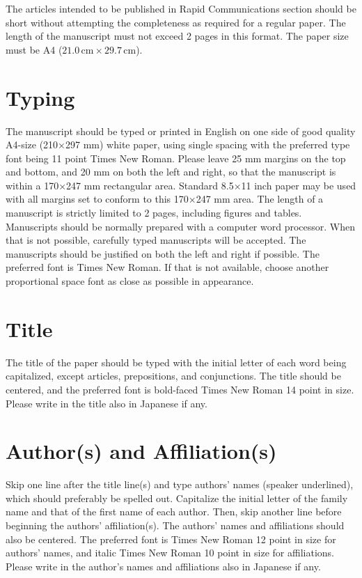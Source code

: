 \documentclass[a4paper,twocolumn,fleqn]{article}
\begin{document}
The articles intended to be published in Rapid Communications section
should be short without attempting the completeness as required for a
regular paper.  The length of the manuscript must not exceed 2
pages in this format.  The paper size must be A4 ($21.0\,\mathrm{cm}
\times 29.7\,\mathrm{cm}$).

\section{Typing}
The manuscript should be typed or printed in English
on one side of good quality A4-size (210×297 mm) white paper,
using single spacing with the preferred type font
being 11 point Times New Roman.
%
Please leave 25 mm margins on the top and bottom,
and 20 mm on both the left and right,
so that the manuscript is within a 170×247 mm rectangular area.
%
Standard 8.5×11 inch paper may be used with all margins set to conform to
this 170×247 mm area.
%
The length of a manuscript is strictly limited to 2 pages,
including figures and tables.
%
Manuscripts should be normally prepared with a computer word processor.
%
When that is not possible, carefully typed manuscripts will be accepted.
%
The manuscripts should be justified on both the left and right if possible.
The preferred font is Times New Roman.
If that is not available, choose another proportional space font
as close as possible in appearance.

\section{Title}

The title of the paper should be typed with the initial letter of each word being capitalized, except articles, prepositions, and conjunctions. The title should be centered, and the preferred font is bold-faced Times New Roman 14 point in size. Please write in the title also in Japanese if any.

\section{Author(s) and Affiliation(s)}
Skip one line after the title line(s) and type authors’ names
(speaker underlined), which should preferably be spelled out.
Capitalize the initial letter of the family name and
that of the first name of each author.
%
Then, skip another line before beginning the authors' affiliation(s).
The authors' names and affiliations should also be centered.
%
The preferred font is Times New Roman 12 point in size for authors' names,
and italic Times New Roman 10 point in size for affiliations.
Please write in the author's names and affiliations also in Japanese if any.
\end{document}
